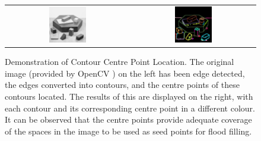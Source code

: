 \begin{figure}[H]
    \begin{center}
    \begin{tabular}{ c c }
        \includegraphics[width=0.31\textwidth]{Figures/blox.jpg} &
        \includegraphics[width=0.31\textwidth]{Figures/ContourCentres.jpg}
    \end{tabular}
    \caption[Demonstration of Contour Centre Point Location]{Demonstration of Contour Centre Point Location. The original image (provided by OpenCV \cite{OpenCV}) on the left has been edge detected, the edges converted into contours, and the centre points of these contours located. The results of this are displayed on the right, with each contour and its corresponding centre point in a different colour. It can be observed that the centre points provide adequate coverage of the spaces in the image to be used as seed points for flood filling.}
    \label{fig:ContourCentres}
    \end{center}
\end{figure}
